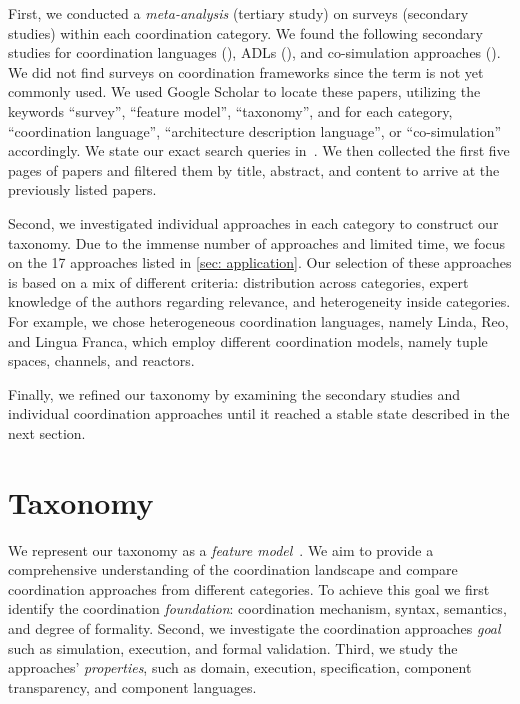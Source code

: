 \documentclass[runningheads]{llncs}
\newcommand{\quotes}[1]{``#1''}
\begin{document}
First, we conducted a \textit{meta-analysis} (tertiary study) on surveys (secondary studies) within each coordination category.
We found the following  secondary studies for coordination languages (\cite{papadopoulosCoordinationModelsLanguages1998,goosCoordinationModelsLanguages2001,rossiTuplebasedTechnologiesCoordination2001}), ADLs (\cite{clementsSurveyArchitectureDescription1996,medvidovicClassificationComparisonFramework2000,hussainInvestigatingArchitectureDescription2013,ozkayaAreWeThere2013,malavoltaWhatIndustryNeeds2013}), and co-simulation approaches (\cite{gomesCoSimulationSurvey2019,schweigerEmpiricalSurveyCosimulation2019,hafnerOverviewStateArt2021}).
We did not find surveys on coordination frameworks since the term is not yet commonly used.
We used Google Scholar to locate these papers, utilizing the keywords \quotes{survey}, \quotes{feature model}, \quotes{taxonomy}, and for each category, \quotes{coordination language}, \quotes{architecture description language}, or \quotes{co-simulation} accordingly.
We state our exact search queries in~\cite{timkrauterArtifactsCoordination2024}.
We then collected the first five pages of papers and filtered them by title, abstract, and content to arrive at the previously listed papers.

Second, we investigated individual approaches in each category to construct our taxonomy.
Due to the immense number of approaches and limited time, we focus on the 17 approaches listed in \autoref{sec: application}.
Our selection of these approaches is based on a mix of different criteria: distribution across categories, expert knowledge of the authors regarding relevance, and heterogeneity inside categories.
For example, we chose heterogeneous coordination languages, namely Linda, Reo, and Lingua Franca, which employ different coordination models, namely tuple spaces, channels, and reactors.

Finally, we refined our taxonomy by examining the secondary studies and individual coordination approaches until it reached a stable state described in the next section.

\section{Taxonomy} \label{sec: taxonomy}
We represent our taxonomy as a \textit{feature model}~\cite{kangFeatureOrientedDomainAnalysis1990}.
We aim to provide a comprehensive understanding of the coordination landscape and compare coordination approaches from different categories.
To achieve this goal we first identify the coordination \textit{foundation}: coordination mechanism, syntax, semantics, and degree of formality.
Second, we investigate the coordination approaches \textit{goal} such as simulation, execution, and formal validation.
Third, we study the approaches' \textit{properties}, such as domain, execution, specification, component transparency, and component languages.
\end{document}
